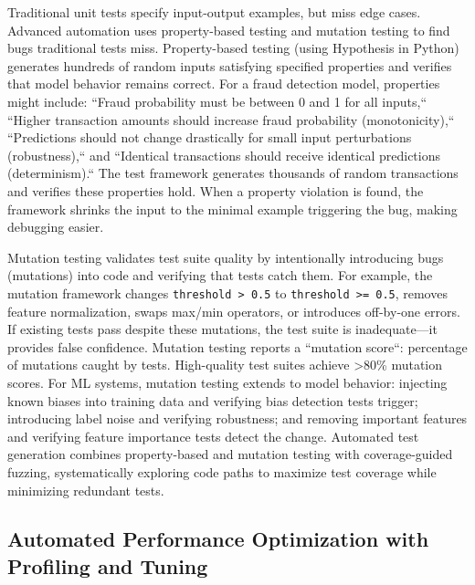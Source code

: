 Traditional unit tests specify input-output examples, but miss edge cases. Advanced automation uses property-based testing and mutation testing to find bugs traditional tests miss. Property-based testing (using Hypothesis in Python) generates hundreds of random inputs satisfying specified properties and verifies that model behavior remains correct. For a fraud detection model, properties might include: ``Fraud probability must be between 0 and 1 for all inputs,`` ``Higher transaction amounts should increase fraud probability (monotonicity),`` ``Predictions should not change drastically for small input perturbations (robustness),`` and ``Identical transactions should receive identical predictions (determinism).`` The test framework generates thousands of random transactions and verifies these properties hold. When a property violation is found, the framework shrinks the input to the minimal example triggering the bug, making debugging easier.

Mutation testing validates test suite quality by intentionally introducing bugs (mutations) into code and verifying that tests catch them. For example, the mutation framework changes \texttt{threshold > 0.5} to \texttt{threshold >= 0.5}, removes feature normalization, swaps max/min operators, or introduces off-by-one errors. If existing tests pass despite these mutations, the test suite is inadequate---it provides false confidence. Mutation testing reports a ``mutation score``: percentage of mutations caught by tests. High-quality test suites achieve >80\% mutation scores. For ML systems, mutation testing extends to model behavior: injecting known biases into training data and verifying bias detection tests trigger; introducing label noise and verifying robustness; and removing important features and verifying feature importance tests detect the change. Automated test generation combines property-based and mutation testing with coverage-guided fuzzing, systematically exploring code paths to maximize test coverage while minimizing redundant tests.

\subsection{Automated Performance Optimization with Profiling and Tuning}

